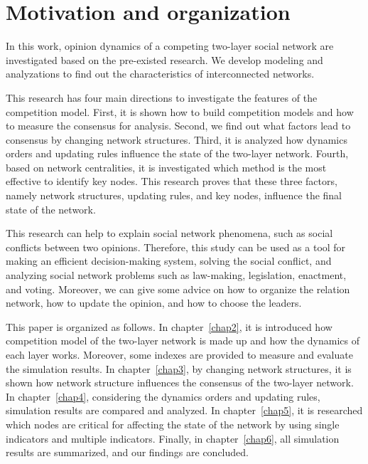 \section{Motivation and organization}

In this work, opinion dynamics of a competing two-layer social network are investigated based on the pre-existed research\parencite{alvarez2016, gomez2015, diep2017, rocca2014}. We develop modeling and analyzations to find out the characteristics of interconnected networks. 

This research has four main directions to investigate the features of the competition model. First, it is shown how to build competition models and how to measure the consensus for analysis. Second, we find out what factors lead to consensus by changing network structures. Third, it is analyzed how dynamics orders and updating rules influence the state of the two-layer network. Fourth, based on network centralities, it is investigated which method is the most effective to identify key nodes. This research proves that these three factors, namely network structures, updating rules, and key nodes, influence the final state of the network.

This research can help to explain social network phenomena, such as social conflicts between two opinions. Therefore, this study can be used as a tool for making an efficient decision-making system, solving the social conflict, and analyzing social network problems such as law-making, legislation, enactment, and voting. Moreover, we can give some advice on how to organize the relation network, how to update the opinion, and how to choose the leaders.

This paper is organized as follows. In chapter~\ref{chap2}, it is introduced how competition model of the two-layer network is made up and how the dynamics of each layer works. Moreover, some indexes are provided to measure and evaluate the simulation results. In chapter~\ref{chap3}, by changing network structures, it is shown how network structure influences the consensus of the two-layer network. In chapter~\ref{chap4}, considering the dynamics orders and updating rules, simulation results are compared and analyzed. In chapter~\ref{chap5}, it is researched which nodes are critical for affecting the state of the network by using single indicators and multiple indicators. Finally, in chapter~\ref{chap6}, all simulation results are summarized, and our findings are concluded. \\


